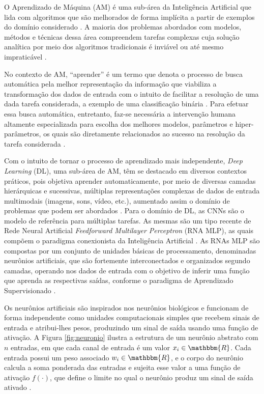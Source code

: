 
O Aprendizado de Máquina (AM) é uma sub-área da Inteligência Artificial que lida com algoritmos que são melhorados de forma implícita a partir de exemplos do domínio considerado \cite{Faceli:Livro}. A maioria dos problemas abordados com modelos, métodos e técnicas dessa área compreendem tarefas complexas cuja solução analítica por meio dos algoritmos tradicionais é inviável ou até mesmo impraticável \cite{Brink:MachineLearningLivro}.

No contexto de AM, ``aprender'' é um termo que denota o processo de busca automática pela melhor representação da informação que viabiliza a transformação dos dados de entrada com o intuito de facilitar a resolução de uma dada tarefa considerada, a exemplo de uma classificação binária \cite{Chollet:2017}. Para efetuar essa busca automática, entretanto, faz-se necessária a intervenção humana altamente especializada para escolha dos melhores modelos, parâmetros e hiper-parâmetros, os quais são diretamente relacionados ao sucesso na resolução da tarefa considerada \cite{Khan:2018}.

Com o intuito de tornar o processo de aprendizado mais independente, \emph{Deep Learning} (DL), uma sub-área de AM, têm se destacado em diversos contextos práticos, pois objetiva aprender automaticamente, por meio de diversas camadas hierárquicas e sucessivas, múltiplas representações complexas de dados de entrada multimodais (imagens, sons, vídeo, etc.), aumentado assim o domínio de problemas que podem ser abordados \cite{Buduma:2018}. Para o domínio de DL, as CNNs são o modelo de referência para múltiplas tarefas. As mesmas são um tipo recente de Rede Neural Artificial \emph{Feedforward Multilayer Perceptron} (RNA MLP), as quais compõem o paradigma conexionista da Inteligência Artificial \cite{Russel:IABiblia}. As RNAs MLP são compostas por um conjunto de unidades básicas de processamento, denominadas neurônios artificiais, que são fortemente interconectados e organizados segundo camadas, operando nos dados de entrada com o objetivo de inferir uma função que aprenda as respectivas saídas, conforme o paradigma de Aprendizado Supervisionado \cite{Khan:2018}.

Os neurônios artificiais são inspirados nos neurônios biológicos e funcionam de forma independente como unidades computacionais simples que recebem sinais de entrada e atribui-lhes pesos, produzindo um sinal de saída usando uma função de ativação. A Figura \ref{fig:neuronio} ilustra a estrutura de um neurônio abstrato com $n$ entradas, em que cada canal de entrada é um valor $x_i \in \mathbbm{R}$. Cada entrada possui um peso associado $w_i \in \mathbbm{R}$, e o corpo do neurônio calcula a soma ponderada das entradas e sujeita esse valor a uma função de ativação $f(\cdot)$, que define o limite no qual o neurônio produz um sinal de saída ativado \cite{Teresa:Livro}.

